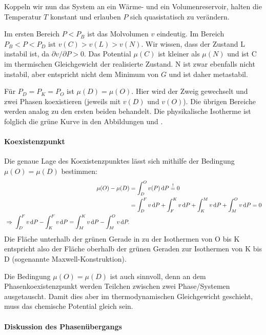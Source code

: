 Koppeln wir nun das System an ein Wärme- und ein Volumenreservoir, halten die Temperatur $T$ konstant und erlauben $P$ sich quasistatisch zu verändern.

Im ersten Bereich $P<P_B$ ist das Molvolumen $v$ eindeutig. Im Bereich $P_B<P<P_D$ ist $v(C)>v(L)>v(N)$. Wir wissen, dass der Zustand L instabil ist, da $\partial v/\partial P>0$. Das Potential $\mu(C)$ ist kleiner als $\mu(N)$ und  ist C im thermischen Gleichgewicht der realisierte Zustand. N ist zwar ebenfalls nicht instabil, aber entspricht nicht dem Minimum von $G$ und ist daher metastabil.

Für $P_D=P_K=P_O$ ist $\mu(D) = \mu(O)$. Hier wird der Zweig gewechselt und zwei Phasen koexistieren (jeweils mit $v(D)$ und $v(O)$). Die übrigen Bereiche werden analog zu den ersten beiden behandelt. Die physikalische Isotherme ist folglich die grüne Kurve in den Abbildungen  und .


\paragraph*{Koexistenzpunkt}

Die genaue Lage des Koexistenzpunktes lässt sich mithilfe der Bedingung $\mu(O)=\mu(D)$ bestimmen:
\begin{align*}
    \mu(O)-\mu(D) & = \int_D^Ov(P)\diff P \overset{!}{=}0                                       \\
                  & = \int_D^F v\diff P+\int_F^K v\diff P+\int_K^M v\diff P+\int_M^O v\diff P=0 \\
    \implication \int_D^F v\diff P-\int_K^F v\diff P=\int_M^K v\diff P-\int_M^O v\diff P.
\end{align*}
Die Fläche unterhalb der grünen Gerade in  zu der Isothermen von O bis K entspricht also der Fläche oberhalb der grünen Geraden zur Isothermen von K bis D (sogenannte Maxwell-Konstruktion).


Die Bedingung $\mu(O)=\mu(D)$ ist auch sinnvoll, denn an dem Phasenkoexistenzpunkt werden Teilchen zwischen zwei Phase/Systemen ausgetauscht. Damit dies aber im thermodynamischen Gleichgewicht geschieht, muss das chemische Potential gleich sein.


\paragraph*{Diskussion des Phasenübergangs}

